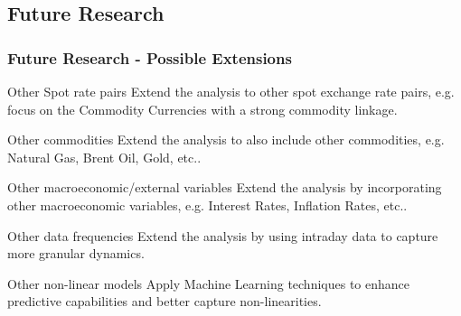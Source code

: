 \subsection{Future Research}
\begin{frame}
	\frametitle{Future Research - Possible Extensions}
    \begin{block}{Other Spot rate pairs}
		Extend the analysis to other spot exchange rate pairs, e.g. focus on the Commodity Currencies with a strong commodity linkage.
	\end{block}
    \begin{block}{Other commodities}
		Extend the analysis to also include other commodities, e.g. Natural Gas, Brent Oil, Gold, etc..
	\end{block}
    \begin{block}{Other macroeconomic/external variables}
		Extend the analysis by incorporating other macroeconomic variables, e.g. Interest Rates, Inflation Rates, etc..
	\end{block}
    \begin{block}{Other data frequencies}
		Extend the analysis by using intraday data to capture more granular dynamics.
	\end{block}
    \begin{block}{Other non-linear models}
		Apply Machine Learning techniques to enhance predictive capabilities and better capture non-linearities.
	\end{block}
\end{frame}